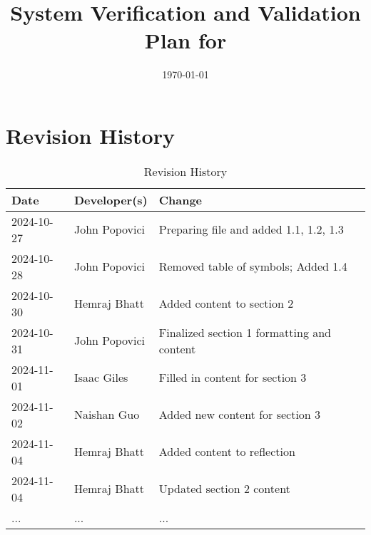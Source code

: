 \documentclass[12pt, titlepage]{article}
\begin{document}
\title{System Verification and Validation Plan for \progname{}} 
\author{\authname}
\date{\today}
	
\maketitle


\section*{Revision History}

\begin{table}[hp]
\caption{Revision History} \label{TblRevisionHistory}
\begin{tabularx}{\textwidth}{llX}
\toprule
\textbf{Date} & \textbf{Developer(s)} & \textbf{Change}\\
\midrule
2024-10-27 & John Popovici & Preparing file and added 1.1, 1.2, 1.3\\
2024-10-28 & John Popovici & Removed table of symbols; Added 1.4\\
2024-10-30 & Hemraj Bhatt & Added content to section 2\\
2024-10-31 & John Popovici & Finalized section 1 formatting and content\\
2024-11-01 & Isaac Giles & Filled in content for section 3\\
2024-11-02 & Naishan Guo & Added new content for section 3\\
2024-11-04 & Hemraj Bhatt & Added content to reflection \\
2024-11-04 & Hemraj Bhatt & Updated section 2 content \\
... & ... & ...\\
\bottomrule
\end{tabularx}
\end{table}

~\\
\end{document}
